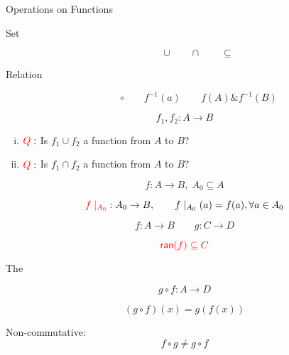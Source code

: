 \begin{frame}{}
  \begin{center}
    {\LARGE Operations on Functions}
  \end{center}

  \pause
  \vspace{0.50cm}
  \begin{description}
    \item[Set]
      \[
	\cup \qquad \cap \qquad \subseteq
      \]
    \item[Relation]
      \[
	\circ \qquad f^{-1}(a) \qquad f(A) \& f^{-1}(B)
      \]
  \end{description}
\end{frame}

\begin{frame}{}
  \begin{definition}
    \[
      f_1, f_2: A \to B
    \]

    \begin{enumerate}[(i)]
	\centering
      \item $\textcolor{red}{Q}:$ Is $f_1 \cup f_2$ a function from $A$ to $B$?
      \item $\textcolor{red}{Q}:$ Is $f_1 \cap f_2$ a function from $A$ to $B$?
    \end{enumerate}
  \end{definition}

  \pause
  \vspace{0.30cm}
  \begin{definition}
    \[
      f: A \to B, \; A_0 \subseteq A
    \]

    \[
      \textcolor{red}{f\mid_{A_0}}: A_0 \to B,\qquad f\mid_{A_0}(a) = f(a), \forall a \in A_0
    \]
  \end{definition}
\end{frame}

\begin{frame}{}
  \begin{definition}[Composition]
    \[
      f: A \to B \qquad g: C \to D
    \]

    \[
      \textcolor{red}{\textsf{ran}(f) \subseteq C}
    \]

    The 

    \[
      g \circ f : A \to D
    \]

    \[
      (g \circ f) (x) = g(f(x))
    \]
  \end{definition}

  \pause
  \begin{alertblock}{Non-commutative:}
    \[
      f \circ g \neq g \circ f
    \]
  \end{alertblock}
\end{frame}

